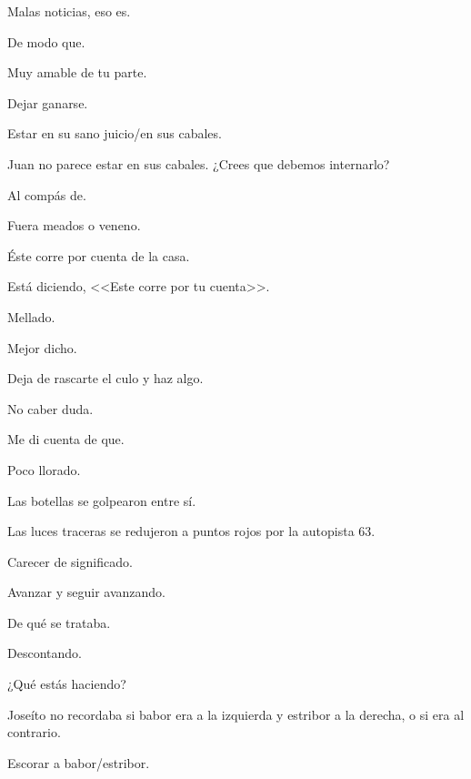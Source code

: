 \sk
Malas noticias, eso es. 

\sk
De modo que. 

\sk
Muy amable de tu parte. 

\sk
Dejar ganarse. 

\sk
Estar en su sano juicio/en sus cabales. 

\sk
Juan no parece estar en sus cabales. ¿Crees que debemos internarlo? 

\sk
Al compás de. 

\sk
Fuera meados o veneno. 

\sk
Éste corre por cuenta de la casa. 

\sk
Está diciendo, <<Este corre por tu cuenta>>. 

\sk
Mellado. 

\sk
Mejor dicho. 

\sk
Deja de rascarte el culo y haz algo. 

\sk
No caber duda. 

\sk
Me di cuenta de que. 

\sk
Poco llorado. 

\sk
Las botellas se golpearon entre sí. 

\sk
Las luces traceras se redujeron a puntos rojos por la autopista 63.\nb{}

\sk
Carecer de significado. 

\sk
Avanzar y seguir avanzando. 

\sk
De qué se trataba. 

\sk
Descontando. 

\sk
¿Qué estás haciendo? 

\sk
Joseíto no recordaba si babor era a la izquierda y estribor a la derecha, o si era al contrario. 

\sk
Escorar a babor/estribor. 

